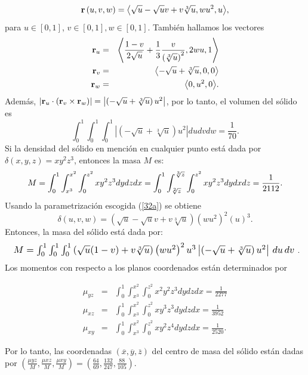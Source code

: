 \begin{equation} \label{32a}
{\bf r}\left( u,v,w\right) =\left\langle \sqrt{u}-\sqrt{u}v+v\sqrt[3]{u},wu^{2},u \right\rangle\!,
\end{equation}
%
para $u\in [0,1]$, $v\in [0,1],w\in [0,1]$.
También hallamos los vectores
{\small
\begin{eqnarray*}
{\bf r}_{u} &=& \left\langle \frac{1-v}{2\sqrt{u}}+\frac{1}{3}\frac{v}{\left(\sqrt[3]{u}\right) ^{2}},2wu,1\right\rangle \\
{\bf r}_{v} &=& \left\langle-\sqrt{u}+\sqrt[3]{u},0,0\right\rangle \\
{\bf r}_{w} &=& \left\langle 0,u^{2},0\right\rangle\!.
\end{eqnarray*}
}
%
Además, $\left| {\bf r}_{u}\cdot \left( {\bf r}_{v}\times {\bf r}_{w}\right) \right| =
\left| \left( -\sqrt{u}+\sqrt[3]{u}\right) u^{2}\right|$,
por lo tanto, el volumen del sólido es
\[\int_{0}^{1}\int_{0}^{1}\int_{0}^{1}\left|\left(-\sqrt{u}+\sqrt[3]{u}\right) u^{2}\right|dudvdw= \frac{1}{70}.\]
%
Si la densidad del sólido en mención en cualquier punto está dada por
$\delta \left( x,y,z\right) =xy^{2}z^{3}$, entonces la masa $M$ es:
%
\[M= \displaystyle \int_{0}^{1}\int_{x^{3}}^{x^{2}}\int_{0}^{z^{2}}xy^{2}z^{3}dydzdx=\displaystyle \int_{0}^{1}\int_{\sqrt[2]{z}}^{\sqrt[3]{z}}\int_{0}^{z^{2}}xy^{2}z^{3}dydxdz= \frac{1}{2112}.\]
%
Usando la parametrización escogida (\ref{32a}) se obtiene
%
\[\delta \left( u,v,w\right) =\left( \sqrt{u}-\sqrt{u}v+v\sqrt[3]{u}\right) \left( wu^{2}\right) ^{2}\left( u\right) ^{3}.\]
%
Entonces, la masa del sólido está dada por:
%
\[
\resizebox{\linewidth}{!}{
$M=\int_{0}^{1}\int_{0}^{1}\int_{0}^{1} \left( \sqrt{u}(1-v)+v\sqrt[3]{u} \right) \left( wu^{2}\right) ^{2}u ^3 \left|\left( -\sqrt{u}+\sqrt[3]{u}\right) u^{2}\right| \,du\,dv$
}.
\]
%
Los momentos con respecto a los planos coordenados están determinados por

{\small
\begin{eqnarray*}
\mu_{yz} &=&\int _0^1\int _{x^3}^{x^2}\int _0^{z^2}x^2 y^2 z^3dydzdx =\frac{1}{2277} \\
\mu_{xz} &=& \int _0^1\int _{x^3}^{x^2}\int _0^{z^2}x y^3 z^3dydzdx =\frac{1}{3952} \\
\mu_{xy} &=& \int _0^1\int _{x^3}^{x^2}\int _0^{z^2}x y^2 z^4dydzdx=\frac{1}{2520}.
\end{eqnarray*}
}

Por lo tanto, las coordenadas $(\overline{x},\overline{y},\overline{z})$ del centro de masa del sólido están dadas por
$\left(\frac{\mu{yz}}{M}, \frac{\mu{xz}}{M},\frac{\mu{xy}}{M}\right)=\left(\frac{64}{69}, \frac{132}{247},\frac{88}{105}\right)$.

